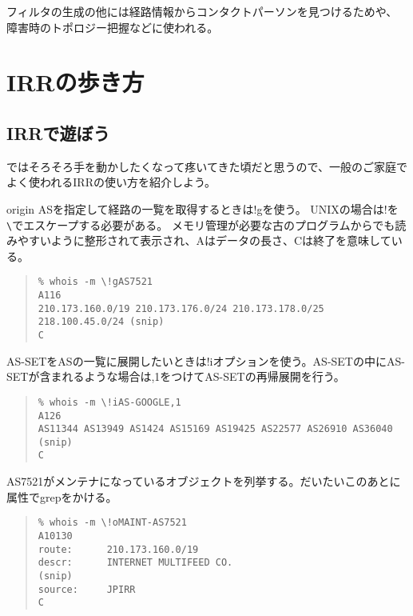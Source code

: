 フィルタの生成の他には経路情報からコンタクトパーソンを見つけるためや、
障害時のトポロジー把握などに使われる。

\section{IRRの歩き方}

\subsection{IRRで遊ぼう}
ではそろそろ手を動かしたくなって疼いてきた頃だと思うので、一般のご家庭でよく使われるIRRの使い方を紹介しよう。

origin ASを指定して経路の一覧を取得するときは!gを使う。
UNIXの場合は!を\verb+\+でエスケープする必要がある。
メモリ管理が必要な古のプログラムからでも読みやすいように整形されて表示され、Aはデータの長さ、Cは終了を意味している。

\begin{quote}
\begin{minilinespace}
\begin{verbatim}
% whois -m \!gAS7521
A116
210.173.160.0/19 210.173.176.0/24 210.173.178.0/25 218.100.45.0/24 (snip)
C
\end{verbatim}
\end{minilinespace}
\end{quote}

AS-SETをASの一覧に展開したいときは!iオプションを使う。AS-SETの中にAS-SETが含まれるような場合は,1をつけてAS-SETの再帰展開を行う。

\begin{quote}
\begin{minilinespace}
\begin{verbatim}
% whois -m \!iAS-GOOGLE,1 
A126
AS11344 AS13949 AS1424 AS15169 AS19425 AS22577 AS26910 AS36040 (snip)
C
\end{verbatim}
\end{minilinespace}
\end{quote}

AS7521がメンテナになっているオブジェクトを列挙する。だいたいこのあとに属性でgrepをかける。

\begin{quote}
\begin{minilinespace}
\begin{verbatim}
% whois -m \!oMAINT-AS7521 
A10130
route:      210.173.160.0/19
descr:      INTERNET MULTIFEED CO.
(snip)
source:     JPIRR
C
\end{verbatim}
\end{minilinespace}
\end{quote}

